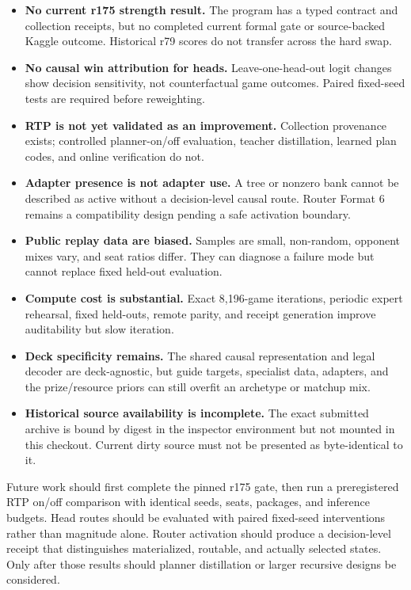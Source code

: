\documentclass[10pt]{article}
\begin{document}
\begin{itemize}
\item \textbf{No current r175 strength result.} The program has a typed contract and collection receipts, but no completed current formal gate or source-backed Kaggle outcome. Historical r79 scores do not transfer across the hard swap.
\item \textbf{No causal win attribution for heads.} Leave-one-head-out logit changes show decision sensitivity, not counterfactual game outcomes. Paired fixed-seed tests are required before reweighting.
\item \textbf{RTP is not yet validated as an improvement.} Collection provenance exists; controlled planner-on/off evaluation, teacher distillation, learned plan codes, and online verification do not.
\item \textbf{Adapter presence is not adapter use.} A tree or nonzero bank cannot be described as active without a decision-level causal route. Router Format 6 remains a compatibility design pending a safe activation boundary.
\item \textbf{Public replay data are biased.} Samples are small, non-random, opponent mixes vary, and seat ratios differ. They can diagnose a failure mode but cannot replace fixed held-out evaluation.
\item \textbf{Compute cost is substantial.} Exact 8,196-game iterations, periodic expert rehearsal, fixed held-outs, remote parity, and receipt generation improve auditability but slow iteration.
\item \textbf{Deck specificity remains.} The shared causal representation and legal decoder are deck-agnostic, but guide targets, specialist data, adapters, and the prize/resource priors can still overfit an archetype or matchup mix.
\item \textbf{Historical source availability is incomplete.} The exact submitted archive is bound by digest in the inspector environment but not mounted in this checkout. Current dirty source must not be presented as byte-identical to it.
\end{itemize}

Future work should first complete the pinned r175 gate, then run a preregistered RTP on/off comparison with identical seeds, seats, packages, and inference budgets. Head routes should be evaluated with paired fixed-seed interventions rather than magnitude alone. Router activation should produce a decision-level receipt that distinguishes materialized, routable, and actually selected states. Only after those results should planner distillation or larger recursive designs be considered.
\end{document}
